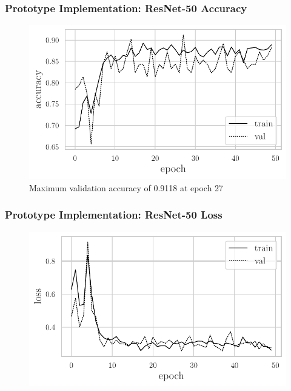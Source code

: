 \documentclass{beamer}
\begin{document}
\begin{frame}
  \frametitle{Prototype Implementation: ResNet-50 Accuracy}
  \begin{figure}[htbp]
    \begin{center}
      \includegraphics[width=\textwidth]{graphics/classifier-metrics-acc.pdf}
      \caption{\normalsize Maximum validation accuracy of 0.9118 at epoch 27}
    \end{center}
  \end{figure}
\end{frame}

\begin{frame}
  \frametitle{Prototype Implementation: ResNet-50 Loss}
  \begin{figure}[htbp]
    \begin{center}
      \includegraphics[width=\textwidth]{graphics/classifier-metrics-loss.pdf}
    \end{center}
  \end{figure}
\end{frame}
\end{document}
